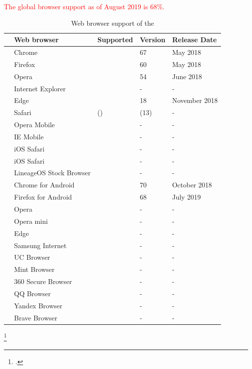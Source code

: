 \textcolor{red}{The global browser support as of August 2019 is 68\%.}
\begin{table}[ht]
\renewcommand\thetable{1}
\begin{tabularx}{\textwidth}{l|p{4.8cm}|p{2cm}|p{2cm}|p{3.3cm}}
	& Web browser & Supported & Version & Release Date \\
	\hline
	\parbox[t]{2mm}{} & Chrome & \OK & 67 & May 2018 \\
	& Firefox & \OK & 60 & May 2018 \\
	& Opera & \OK & 54 & June 2018 \\
	& Internet Explorer & \NOOK & - & - \\
	& Edge & \OK & 18 & November 2018 \\
	& Safari & (\OK) & (13) & - \\
	\hline
	\parbox[t]{2mm}{} & Opera Mobile & \NOOK & - & - \\
	& IE Mobile & \NOOK & - & - \\
	& iOS Safari & \NOOK & - & - \\
	& iOS Safari & \NOOK & - & - \\
	\hline
	\parbox[t]{2mm}{} & LineageOS Stock Browser & \NOOK & - & - \\
	& Chrome for Android & \OK & 70 & October 2018 \\
	& Firefox for Android & \OK & 68 & July 2019 \\
	& Opera & \NOOK & - & - \\
	& Opera mini & \NOOK & - & - \\
	& Edge & \NOOK & - & - \\
	& Samsung Internet & \NOOK & - & - \\
	& UC Browser & \NOOK & - & - \\
	& Mint Browser & \NOOK & - & - \\
	& 360 Secure Browser & \NOOK & - & - \\
	& QQ Browser & \NOOK & - & - \\
	& Yandex Browser & \NOOK & - & - \\
	& Brave Browser & \NOOK & - & -
\end{tabularx}
\caption[Web browser support of the \wa]{Web browser support of the \wa\footnotemark} \label{tab:browser-support}
\end{table}
\footcitetexts[Sources:][]{chrome-webauthn}{firefox-webauthn}{safari-webauthn}{chrome-android-webauthn}[a detailed analysis of Android browsers is available on the CD in the appendix.]{firefox-android-webauthn}
\newpage

